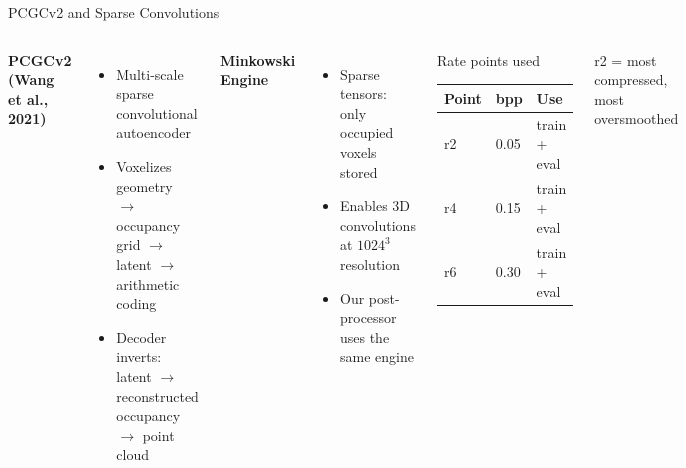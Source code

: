 \documentclass[aspectratio=169]{beamer}
\begin{document}
\begin{frame}{PCGCv2 and Sparse Convolutions}
  \begin{columns}[T]
    \textbf{PCGCv2 (Wang et al., 2021)}
    \begin{itemize}
      \item Multi-scale sparse convolutional autoencoder
      \item Voxelizes geometry $\to$ occupancy grid $\to$ latent $\to$ arithmetic coding
      \item Decoder inverts: latent $\to$ reconstructed occupancy $\to$ point cloud
    \end{itemize}
    \vspace{6pt}
    \textbf{Minkowski Engine}
    \begin{itemize}
      \item Sparse tensors: only occupied voxels stored
      \item Enables 3D convolutions at $1024^3$ resolution
      \item Our post-processor uses the same engine
    \end{itemize}

    \begin{block}{Rate points used}
      \small
      \begin{tabular}{lll}
        \toprule
        Point & bpp & Use \\
        \midrule
        r2 & 0.05 & train + eval \\
        r4 & 0.15 & train + eval \\
        r6 & 0.30 & train + eval \\
        \bottomrule
      \end{tabular}
    \end{block}
    \vspace{4pt}
    {\small r2 = most compressed, most oversmoothed}
  \end{columns}
\end{frame}
\end{document}
